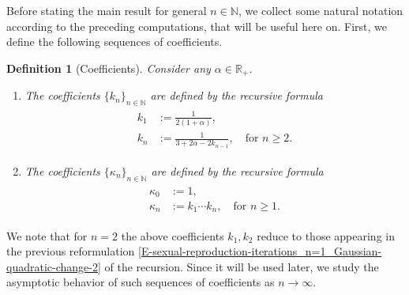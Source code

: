 \documentclass[reqno]{amsart}
\newtheorem{definition}{Definition}[section]
\numberwithin{equation}{section}
\begin{document}
{\medskip

Before stating the main result for general $n\in\mathbb{N}$, we collect some natural notation according to the preceding computations, that will be useful here on. First, we define the following sequences of coefficients.

\begin{definition}[Coefficients]\label{D-sexual-reproduction-coefficients}
Consider any $\alpha\in \mathbb{R}_+$.
\begin{enumerate}
\item The coefficients $\{k_n\}_{n\in \mathbb{N}}$ are defined by the recursive formula
\begin{align}\label{E-sexual-reproduction-coefficients}
\begin{aligned}
k_1&:=\frac{1}{2(1+\alpha)},\\
k_n&:=\frac{1}{3+2\alpha-2k_{n-1}},\quad \text{for }n\geq 2.
\end{aligned}
\end{align}
\item The coefficients $\{\kappa_n\}_{n\in \mathbb{N}}$ are defined by the recursive formula
\begin{align}\label{E-sexual-reproduction-coefficients-kappa}
\begin{aligned}
\kappa_0&:=1,\\
\kappa_n&:=k_1\cdots k_n,\quad \text{for }n\geq 1.
\end{aligned}
\end{align}
\end{enumerate}
\end{definition}

We note that for $n=2$ the above coefficients $k_1,k_2$ reduce to those appearing in the previous reformulation \eqref{E-sexual-reproduction-iterations_n=1_Gaussian-quadratic-change-2} of the recursion. Since it will be used later, we study the asymptotic behavior of such sequences of coefficients as $n\rightarrow \infty$.
	
}
\end{document}
